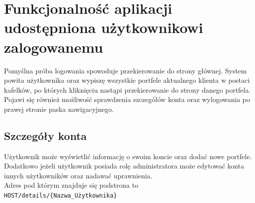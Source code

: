 \section{Funkcjonalność aplikacji udostępniona użytkownikowi zalogowanemu}
Pomyślna próba logowania spowoduje przekierowanie do strony głównej. System powita użytkownika oraz wypiszę wszystkie portfele aktualnego klienta w postaci kafelków, po których kliknięciu nastąpi przekierowanie do strony danego portfela. Pojawi się również możliwość sprawdzenia szczegółów konta oraz wylogowania po prawej stronie paska nawigacyjnego. 
\subsection*{Szczegóły konta}
Użytkownik może wyświetlić informację o swoim koncie oraz dodać nowe portfele. Dodatkowo jeżeli użytkownik posiada rolę administratora może edytować konta innych użytkowników oraz nadawać uprawnienia.
\\Adres pod którym znajduje się podstrona to \texttt{HOST/details/\{Nazwa\_Użytkownika\}}
